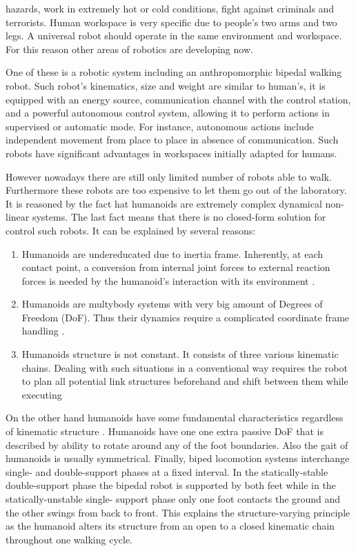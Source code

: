 \documentclass[12pt,a4paper]{report}
\begin{document}
hazards, work in extremely hot or cold conditions, fight against criminals and terrorists.
		Human workspace is very specific due to people's two arms and two legs. A universal robot should operate in the same environment and workspace. For this reason other areas of robotics are developing now.
		
		One of these is a robotic system including an anthropomorphic bipedal walking robot. Such robot's kinematics, size and weight are similar to human's, it is equipped with an energy source, communication channel with the control station, and a powerful autonomous control system, allowing it to perform actions in supervised or automatic mode. For instance, autonomous actions include independent movement from place to place in absence of communication. Such robots have significant advantages in workspaces initially adapted for humans.
		
		However nowadays there are still only limited number of robots able to walk. Furthermore these robots are too expensive to let them go out of the laboratory. It is reasoned by the fact hat humanoids are extremely complex dynamical non-linear systems. The last fact means that there is no closed-form solution for control such robots. It can be explained by several reasons: 
		
		\begin{enumerate}
			\item Humanoids are undereducated due to inertia frame. Inherently, at each contact point, a conversion from internal joint forces to external reaction forces is needed by the humanoid’s interaction with its environment \cite{sugihara2005fast}.
			\item Humanoids are multybody systems with very big amount of Degrees of Freedom (DoF). Thus their dynamics require a complicated coordinate frame handling \cite{sugihara2005fast}. 
			\item Humanoids structure is not constant. It consists of three various kinematic chains. Dealing with such situations in a conventional way requires the robot to plan all potential link structures beforehand and shift between them while executing \cite{	sugihara2005fast}
		\end{enumerate}
		
		On the other hand humanoids have some fundamental characteristics regardless of kinematic structure \cite{vukobratovic2004zero}. Humanoids have one one extra passive DoF that is described by ability to rotate around any of the foot boundaries. Also the gait of humanoids is usually symmetrical. Finally, biped locomotion systems interchange single- and double-support phases at a fixed interval. In the statically-stable double-support phase the bipedal robot is supported by both feet while in the statically-unstable single- support phase only one foot contacts the ground and the other swings from back to front. This explains the structure-varying principle as the humanoid alters its structure from an open to a closed kinematic chain throughout one walking cycle. \cite{controlbipedal}
		
\end{document}
